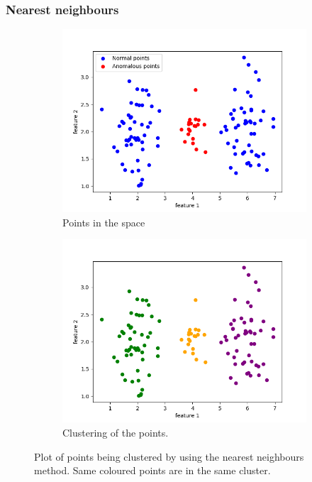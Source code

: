 \documentclass[oneside, a4paper, onecolumn, 11pt]{article}
\begin{document}
\subsubsection{Nearest neighbours}
\begin{figure}[H]
  \centering
  \begin{subfigure}{0.35\textwidth}
      \centering
      \includegraphics[width=\linewidth]{images/clustnn.png}
      \caption{Points in the space}
  \end{subfigure}
  \begin{subfigure}{0.35\textwidth}
      \centering
      \includegraphics[width=\linewidth]{images/actual_nn.png}
      \caption{Clustering of the points.}
  \end{subfigure}
  \caption{Plot of points being clustered by using the nearest neighbours method. Same coloured points are in the same cluster.}
  \label{fig:nn_sep}
\end{figure}
\end{document}
